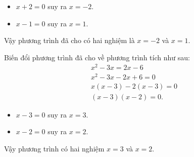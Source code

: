 \begin{vd}
{\begin{listEX}
\begin{itemize}
	\item $x+2=0$ suy ra $x=-2$.
	\item $x-1=0$ suy ra $x=1$.
	\end{itemize}
	Vậy phương trình đã cho có hai nghiệm là $x=-2$ và $x=1$.
	\item 
	Biến đổi phương trình đã cho về phương trình tích như sau:
	\begin{align*}
	&x^2-3x=2x-6\\
	&x^2-3x-2x+6=0\\
	&x(x-3)-2(x-3)=0\\
	&(x-3)(x-2)=0.
	\end{align*}
	\begin{itemize}
	\item $x-3=0$ suy ra $x=3$.
	\item $x-2=0$ suy ra $x=2$.
	\end{itemize}
	Vậy phương trình có hai nghiệm $x=3$ và $x=2$.
	\end{listEX}
	}
\end{vd}
